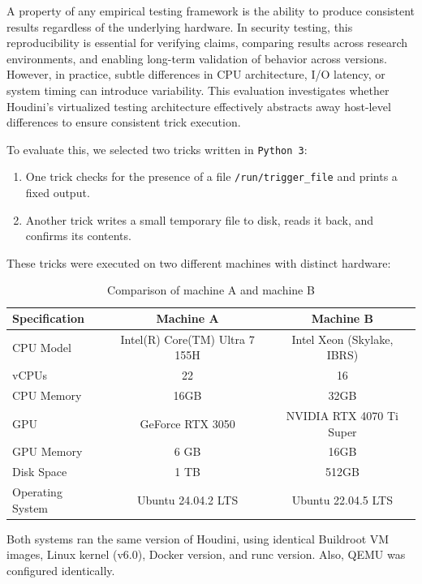\documentclass[12pt]{report}
\begin{document}
\begin{doublespace}
A property of any empirical testing framework is the ability to produce consistent results regardless of the underlying hardware. In security testing, this reproducibility is essential for verifying claims, comparing results across research environments, and enabling long-term validation of behavior across versions. However, in practice, subtle differences in CPU architecture, I/O latency, or system timing can introduce variability. This evaluation investigates whether Houdini’s virtualized testing architecture effectively abstracts away host-level differences to ensure consistent trick execution.

To evaluate this, we selected two tricks written in \texttt{Python 3}:

\begin{enumerate}
    \item One trick checks for the presence of a file \texttt{/run/trigger\_file} and prints a fixed output.
    \item Another trick writes a small temporary file to disk, reads it back, and confirms its contents.
\end{enumerate}

These tricks were executed on two different machines with distinct hardware:

\begin{table}[h]
\centering
\caption{Comparison of machine A and machine B}
\label{tab:machine-comparison}
\begin{tabular}{|l|c|c|}
\hline
\textbf{Specification} & \textbf{Machine A} & \textbf{Machine B} \\
\hline
CPU Model & Intel(R) Core(TM) Ultra 7 155H & Intel Xeon (Skylake, IBRS) \\
vCPUs & 22 & 16 \\
CPU Memory & 16GB & 32GB \\
GPU & GeForce RTX 3050 & NVIDIA RTX 4070 Ti Super \\
GPU Memory & 6 GB & 16GB \\
Disk Space & 1 TB & 512GB \\
Operating System & Ubuntu 24.04.2 LTS & Ubuntu 22.04.5 LTS \\
\hline
\end{tabular}
\end{table}

Both systems ran the same version of Houdini, using identical Buildroot VM images, Linux kernel (v6.0), Docker version, and runc version. Also, QEMU was configured identically.


\end{doublespace}
\end{document}
